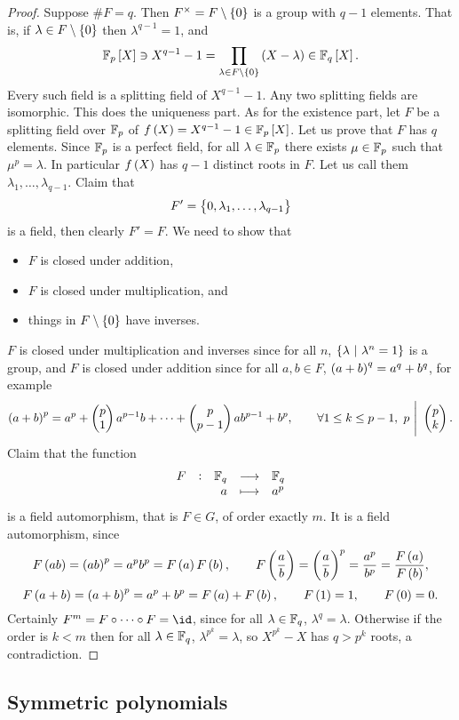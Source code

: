 \begin{proof}
Suppose $ \#F = q $. Then $ F^\times = F \setminus \cbr{0} $ is a group with $ q - 1 $ elements. That is, if $ \lambda \in F \setminus \cbr{0} $ then $ \lambda^{q - 1} = 1 $, and
$$ \FF_p\sbr{X} \ni X^{q - 1} - 1 = \prod_{\lambda \in F \setminus \cbr{0}} \br{X - \lambda} \in \FF_q\sbr{X}. $$
Every such field is a splitting field of $ X^{q - 1} - 1 $. Any two splitting fields are isomorphic. This does the uniqueness part. As for the existence part, let $ F $ be a splitting field over $ \mathbb{F}_p $ of $ f\br{X} = X^{q - 1} - 1 \in \FF_p\sbr{X} $. Let us prove that $ F $ has $ q $ elements. Since $ \mathbb{F}_p $ is a perfect field, for all $ \lambda \in \mathbb{F}_p $ there exists $ \mu \in \mathbb{F}_p $ such that $ \mu^p = \lambda $. In particular $ f\br{X} $ has $ q - 1 $ distinct roots in $ F $. Let us call them $ \lambda_1, \dots, \lambda_{q - 1} $. Claim that
$$ F' = \cbr{0, \lambda_1, \dots, \lambda_{q - 1}} $$
is a field, then clearly $ F' = F $. We need to show that
\begin{itemize}
\item $ F $ is closed under addition,
\item $ F $ is closed under multiplication, and
\item things in $ F \setminus \cbr{0} $ have inverses.
\end{itemize}
$ F $ is closed under multiplication and inverses since for all $ n $, $ \cbr{\lambda \st \lambda^n = 1} $ is a group, and $ F $ is closed under addition since for all $ a, b \in F $, $ \br{a + b}^q = a^q + b^q $, for example
$$ \br{a + b}^p = a^p + \twobyone{p}{1}a^{p - 1}b + \dots + \twobyone{p}{p - 1}ab^{p - 1} + b^p, \qquad \forall 1 \le k \le p - 1, \ p \ \Bigg| \ \twobyone{p}{k}. $$
Claim that the function
$$ \function[F]{\FF_q}{\FF_q}{a}{a^p} $$
is a field automorphism, that is $ F \in G $, of order exactly $ m $. It is a field automorphism, since
$$ F\br{ab} = \br{ab}^p = a^pb^p = F\br{a}F\br{b}, \qquad F\br{\dfrac{a}{b}} = \br{\dfrac{a}{b}}^p = \dfrac{a^p}{b^p} = \dfrac{F\br{a}}{F\br{b}}, $$
$$ F\br{a + b} = \br{a + b}^p = a^p + b^p = F\br{a} + F\br{b}, \qquad F\br{1} = 1, \qquad F\br{0} = 0. $$
Certainly $ F^m = F \circ \dots \circ F = \id $, since for all $ \lambda \in \mathbb{F}_q $, $ \lambda^q = \lambda $. Otherwise if the order is $ k < m $ then for all $ \lambda \in \mathbb{F}_q $, $ \lambda^{p^k} = \lambda $, so $ X^{p^k} - X $ has $ q > p^k $ roots, a contradiction.
\end{proof}

\subsection{Symmetric polynomials}

